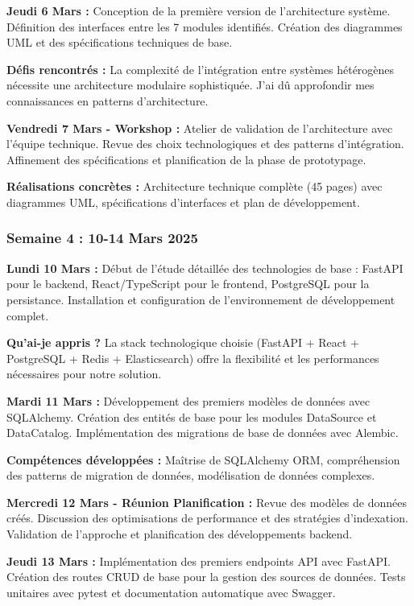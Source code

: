 \documentclass[a4paper,12pt]{article}
\begin{document}
\textbf{Jeudi 6 Mars :}
Conception de la première version de l'architecture système. Définition des interfaces entre les 7 modules identifiés. Création des diagrammes UML et des spécifications techniques de base.

\textbf{Défis rencontrés :} La complexité de l'intégration entre systèmes hétérogènes nécessite une architecture modulaire sophistiquée. J'ai dû approfondir mes connaissances en patterns d'architecture.

\textbf{Vendredi 7 Mars - Workshop :}
Atelier de validation de l'architecture avec l'équipe technique. Revue des choix technologiques et des patterns d'intégration. Affinement des spécifications et planification de la phase de prototypage.

\textbf{Réalisations concrètes :} Architecture technique complète (45 pages) avec diagrammes UML, spécifications d'interfaces et plan de développement.

\subsubsection{Semaine 4 : 10-14 Mars 2025}

\textbf{Lundi 10 Mars :}
Début de l'étude détaillée des technologies de base : FastAPI pour le backend, React/TypeScript pour le frontend, PostgreSQL pour la persistance. Installation et configuration de l'environnement de développement complet.

\textbf{Qu'ai-je appris ?} La stack technologique choisie (FastAPI + React + PostgreSQL + Redis + Elasticsearch) offre la flexibilité et les performances nécessaires pour notre solution.

\textbf{Mardi 11 Mars :}
Développement des premiers modèles de données avec SQLAlchemy. Création des entités de base pour les modules DataSource et DataCatalog. Implémentation des migrations de base de données avec Alembic.

\textbf{Compétences développées :} Maîtrise de SQLAlchemy ORM, compréhension des patterns de migration de données, modélisation de données complexes.

\textbf{Mercredi 12 Mars - Réunion Planification :}
Revue des modèles de données créés. Discussion des optimisations de performance et des stratégies d'indexation. Validation de l'approche et planification des développements backend.

\textbf{Jeudi 13 Mars :}
Implémentation des premiers endpoints API avec FastAPI. Création des routes CRUD de base pour la gestion des sources de données. Tests unitaires avec pytest et documentation automatique avec Swagger.
\end{document}

